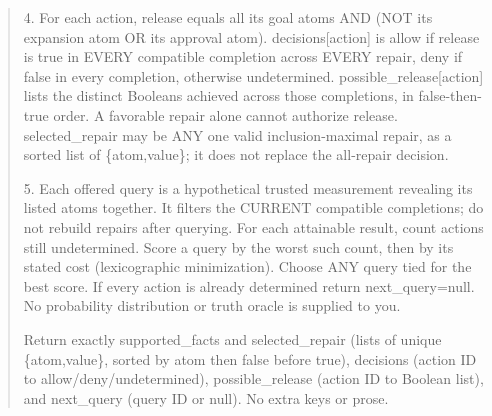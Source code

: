 \documentclass[a4paper,preprint,12pt,numbers,nopreprintline]{elsarticle}
\begin{document}
\begin{quote}
4. For each action, release equals all its goal atoms AND (NOT its expansion atom OR its approval atom). decisions[action] is allow if release is true in EVERY compatible completion across EVERY repair, deny if false in every completion, otherwise undetermined. possible\_release[action] lists the distinct Booleans achieved across those completions, in false-then-true order. A favorable repair alone cannot authorize release. selected\_repair may be ANY one valid inclusion-maximal repair, as a sorted list of \{atom,value\}; it does not replace the all-repair decision.

5. Each offered query is a hypothetical trusted measurement revealing its listed atoms together. It filters the CURRENT compatible completions; do not rebuild repairs after querying. For each attainable result, count actions still undetermined. Score a query by the worst such count, then by its stated cost (lexicographic minimization). Choose ANY query tied for the best score. If every action is already determined return next\_query=null. No probability distribution or truth oracle is supplied to you.

Return exactly supported\_facts and selected\_repair (lists of unique \{atom,value\}, sorted by atom then false before true), decisions (action ID to allow/deny/undetermined), possible\_release (action ID to Boolean list), and next\_query (query ID or null). No extra keys or prose.
\end{quote}
\end{document}
